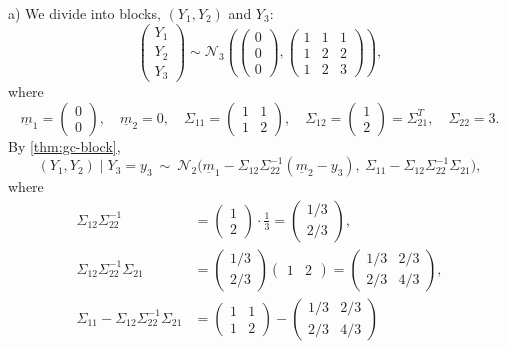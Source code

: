\begin{example}
a) We divide into blocks, $(Y_1,Y_2)$ and $Y_3$:
\[
  \begin{pmatrix}Y_1\\Y_2\\\hline Y_3\end{pmatrix}\sim\mathcal N_3\left(\left(\begin{array}{c}0\\0\\\hline0\end{array}\right),
  \left(\begin{array}{cc|c}1&1&1\\1&2&2\\\hline1&2&3\end{array}\right)\right),
\]
where
\[
  \underline m_1=\begin{pmatrix}0\\0\end{pmatrix},\quad \underline m_2=0,\quad\Sigma_{11}=\begin{pmatrix}1&1\\1&2\end{pmatrix},\quad
  \Sigma_{12}=\begin{pmatrix}1\\2\end{pmatrix}=\Sigma_{21}^T,\quad\Sigma_{22}=3 .
\]
By \cref{thm:gc-block},
\[
  (Y_1,Y_2)\mid Y_3=y_3\ \sim\ \mathcal N_2\big(\underline m_1-\Sigma_{12}\Sigma_{22}^{-1}(\underline m_2-y_3),\ \Sigma_{11}-\Sigma_{12}\Sigma_{22}^{-1}\Sigma_{21}\big),
\]
where
\[
\begin{aligned}
  \Sigma_{12}\Sigma_{22}^{-1}&=\begin{pmatrix}1\\2\end{pmatrix}\cdot\frac13=\begin{pmatrix}1/3\\2/3\end{pmatrix},\\
  \Sigma_{12}\Sigma_{22}^{-1}\Sigma_{21}&=\begin{pmatrix}1/3\\2/3\end{pmatrix}\begin{pmatrix}1&2\end{pmatrix}
  =\begin{pmatrix}1/3&2/3\\2/3&4/3\end{pmatrix},\\
  \Sigma_{11}-\Sigma_{12}\Sigma_{22}^{-1}\Sigma_{21}&=\begin{pmatrix}1&1\\1&2\end{pmatrix}-\begin{pmatrix}1/3&2/3\\2/3&4/3\end{pmatrix}

\end{aligned}\]
\end{example}

